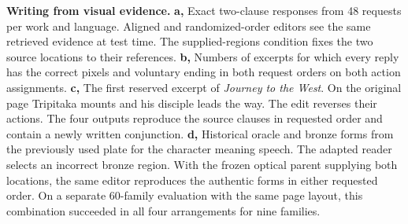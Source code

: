 \textbf{Writing from visual evidence.}
\textbf{a,} Exact two-clause responses from 48 requests per work and language. Aligned and randomized-order editors see the same retrieved evidence at test time. The supplied-regions condition fixes the two source locations to their references. \textbf{b,} Numbers of excerpts for which every reply has the correct pixels and voluntary ending in both request orders on both action assignments. \textbf{c,} The first reserved excerpt of \textit{Journey to the West}. On the original page Tripitaka mounts and his disciple leads the way. The edit reverses their actions. The four outputs reproduce the source clauses in requested order and contain a newly written conjunction. \textbf{d,} Historical oracle and bronze forms from the previously used plate for the character meaning speech. The adapted reader selects an incorrect bronze region. With the frozen optical parent supplying both locations, the same editor reproduces the authentic forms in either requested order. On a separate 60-family evaluation with the same page layout, this combination succeeded in all four arrangements for nine families.
